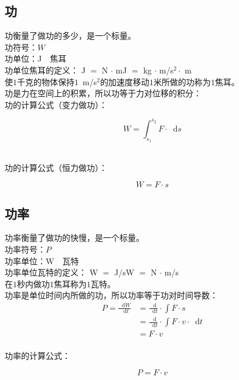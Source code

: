 \documentclass[UTF8]{ctexart}
\newcommand*{\dif}{\mathop{}\!\mathrm{d}}
\begin{document}
\subsection{功}
    功衡量了做功的多少，是一个标量。\\[4mm]
    功符号：$W$\\[1mm]
    功单位：J~~焦耳\\[4mm]
    功单位焦耳的定义：
    J $=$ N $\cdot$ m\qquad J $=$ kg $\cdot$ m/s$^2\cdot$ m\\[2mm]
    使$1$千克的物体保持$1$~m/s$^2$的加速度移动$1$米所做的功称为$1$焦耳。\\[4mm]
    功是力在空间上的积累，所以功等于力对位移的积分：\\[3mm]
    功的计算公式（变力做功）：
    \begin{large}
        \begin{equation*}
            W=\int_{s_1}^{s_2} F\cdot \dif s
        \end{equation*}
    \end{large}\\
    功的计算公式（恒力做功）：
    \begin{large}
        \begin{equation*}
            W=F\cdot s
        \end{equation*}
    \end{large}
    \vspace{-20pt}
    
\subsection{功率}
    功率衡量了做功的快慢，是一个标量。\\[4mm]
    功率符号：$P$\\[1mm]
    功率单位：W~~瓦特\\[4mm]
    功率单位瓦特的定义：
    W $=$ J/s\qquad W $=$ N $\cdot$ m/s\\[2mm]
    在$1$秒内做功$1$焦耳称为$1$瓦特。\\[4mm]
    功率是单位时间内所做的功，所以功率等于功对时间导数：\vspace{15pt}
    \setcounter{equation}{0}
    \begin{align}
        P
        =\frac{\dif W}{\dif t}
        &=\frac{\dif}{\dif t}\cdot\int F\cdot s\\[3mm]
        &=\frac{\dif}{\dif t}\cdot\int F\cdot v\cdot \dif t\\[3mm]
        &=F\cdot v
    \end{align}\\
    功率的计算公式：
    \begin{large}
        \begin{equation*}
            P=F\cdot v
        \end{equation*}
    \end{large}
\end{document}
